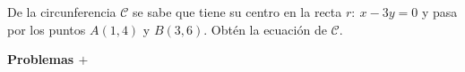 \begin{mipropuesto}

De la circunferencia $\mathcal C$ se sabe que tiene su centro en la recta $r:\ x - 3y = 0$ y pasa por los puntos $A(1, 4)$ y $B(3, 6)$. Obtén la ecuación de $\mathcal C$.
	
\end{mipropuesto}

\vspace{-6mm}
\begin{flushright}
\begin{footnotesize} \textcolor{gris}{}	\end{footnotesize}
\end{flushright}









\vspace{20mm}
\begin{adjustwidth}{50pt}{250pt}
\begin{cuadro-naranja}
\textbf{\huge{Problemas $\boldsymbol{+}$}}\normalsize{$\, $}
\end{cuadro-naranja}	
\end{adjustwidth}

